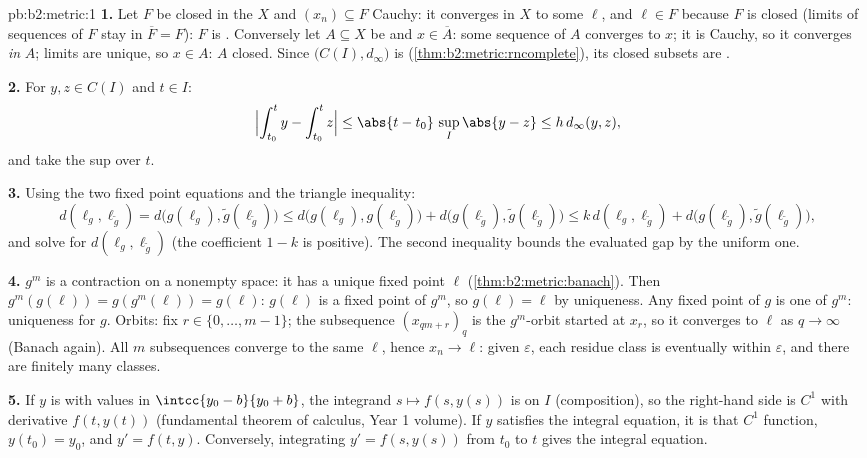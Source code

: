 \begin{solution}{pb:b2:metric:1}
\textbf{1.} Let $F$ be closed in the  $X$ and $(x_n)
\subseteq F$ Cauchy: it converges in $X$ to some $\ell$, and
$\ell \in F$ because $F$ is closed (limits of sequences of $F$
stay in $\overline F = F$): $F$ is . Conversely let $A
\subseteq X$ be  and $x \in \overline A$: some sequence
of $A$ converges to $x$; it is Cauchy, so it converges \emph{in}
$A$; limits are unique, so $x \in A$: $A$ closed. Since
$\bigl(C(I), d_\infty\bigr)$ is 
(\cref{thm:b2:metric:rncomplete}), its closed subsets are
.

\textbf{2.} For $y, z \in C(I)$ and $t \in I$:
\[
\Bigl|\int_{t_0}^{t}y - \int_{t_0}^{t}z\Bigr| \leq
\abs{t - t_0}\,\sup_I\abs{y - z} \leq h\,d_\infty(y, z),
\]
and take the sup over $t$.

\textbf{3.} Using the two fixed point equations and the triangle
inequality:
\[
d(\ell_g, \ell_{\widetilde g})
= d\bigl(g(\ell_g), \widetilde g(\ell_{\widetilde g})\bigr)
\leq d\bigl(g(\ell_g), g(\ell_{\widetilde g})\bigr) +
d\bigl(g(\ell_{\widetilde g}), \widetilde g(\ell_{\widetilde
g})\bigr)
\leq k\,d(\ell_g, \ell_{\widetilde g}) +
d\bigl(g(\ell_{\widetilde g}), \widetilde g(\ell_{\widetilde
g})\bigr),
\]
and solve for $d(\ell_g, \ell_{\widetilde g})$ (the coefficient
$1 - k$ is positive). The second inequality bounds the evaluated
gap by the uniform one.

\textbf{4.} $g^m$ is a contraction on a nonempty  space:
it has a unique fixed point $\ell$
(\cref{thm:b2:metric:banach}). Then $g^m(g(\ell)) =
g(g^m(\ell)) = g(\ell)$: $g(\ell)$ is a fixed point of $g^m$,
so $g(\ell) = \ell$ by uniqueness. Any fixed point of $g$ is one
of $g^m$: uniqueness for $g$. Orbits: fix $r \in \{0, \dots,
m-1\}$; the subsequence $(x_{qm + r})_q$ is the $g^m$-orbit
started at $x_r$, so it converges to $\ell$ as $q \to \infty$
(Banach again). All $m$ subsequences converge to the same
$\ell$, hence $x_n \to \ell$: given $\varepsilon$, each residue
class is eventually within $\varepsilon$, and there are finitely
many classes.

\textbf{5.} If $y$ is  with values in $\intcc{y_0 -
b}{y_0 + b}$, the integrand $s \mapsto f(s, y(s))$ is 
on $I$ (composition), so the right-hand side is $C^1$ with
derivative $f(t, y(t))$ (fundamental theorem of calculus, Year 1
volume). If $y$ satisfies the integral equation, it is that
$C^1$ function, $y(t_0) = y_0$, and $y' = f(t, y)$. Conversely,
integrating $y' = f(s, y(s))$ from $t_0$ to $t$ gives the
integral equation.


\end{solution}
